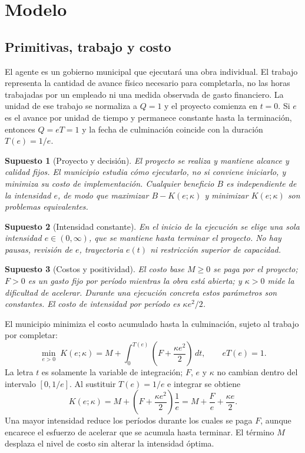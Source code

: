 \documentclass[11pt]{article}
\newtheorem{assumption}{Supuesto}
\begin{document}
\section{Modelo}\label{sec:modelo}
\subsection{Primitivas, trabajo y costo}
El agente es un gobierno municipal que ejecutará una obra individual. El trabajo representa la cantidad de avance físico necesario para completarla, no las horas trabajadas por un empleado ni una medida observada de gasto financiero. La unidad de ese trabajo se normaliza a $Q=1$ y el proyecto comienza en $t=0$. Si $e$ es el avance por unidad de tiempo y permanece constante hasta la terminación, entonces $Q=eT=1$ y la fecha de culminación coincide con la duración $T(e)=1/e$.

\begin{assumption}[Proyecto y decisión]\label{ass:proyecto}
El proyecto se realiza y mantiene alcance y calidad fijos. El municipio estudia cómo ejecutarlo, no si conviene iniciarlo, y minimiza su costo de implementación. Cualquier beneficio $B$ es independiente de la intensidad $e$, de modo que maximizar $B-K(e;\kappa)$ y minimizar $K(e;\kappa)$ son problemas equivalentes.
\end{assumption}
\begin{assumption}[Intensidad constante]\label{ass:intensidad}
En el inicio de la ejecución se elige una sola intensidad $e\in(0,\infty)$, que se mantiene hasta terminar el proyecto. No hay pausas, revisión de $e$, trayectoria $e(t)$ ni restricción superior de capacidad.
\end{assumption}
\begin{assumption}[Costos y positividad]\label{ass:costos}
El costo base $M\geq0$ se paga por el proyecto; $F>0$ es un gasto fijo por período mientras la obra está abierta; y $\kappa>0$ mide la dificultad de acelerar. Durante una ejecución concreta estos parámetros son constantes. El costo de intensidad por período es $\kappa e^2/2$.
\end{assumption}

El municipio minimiza el costo acumulado hasta la culminación, sujeto al trabajo por completar:
\begin{equation}\label{eq:problema}
 \min_{e>0}\;K(e;\kappa)
 =M+\int_0^{T(e)}\left(F+\frac{\kappa e^2}{2}\right)\,dt,
 \qquad eT(e)=1.
\end{equation}
La letra $t$ es solamente la variable de integración; $F$, $e$ y $\kappa$ no cambian dentro del intervalo $[0,1/e]$. Al sustituir $T(e)=1/e$ e integrar se obtiene
\begin{equation}\label{eq:costo}
 K(e;\kappa)=M+\left(F+\frac{\kappa e^2}{2}\right)\frac1e
 =M+\frac Fe+\frac{\kappa e}{2}.
\end{equation}
Una mayor intensidad reduce los períodos durante los cuales se paga $F$, aunque encarece el esfuerzo de acelerar que se acumula hasta terminar. El término $M$ desplaza el nivel de costo sin alterar la intensidad óptima.
\end{document}
